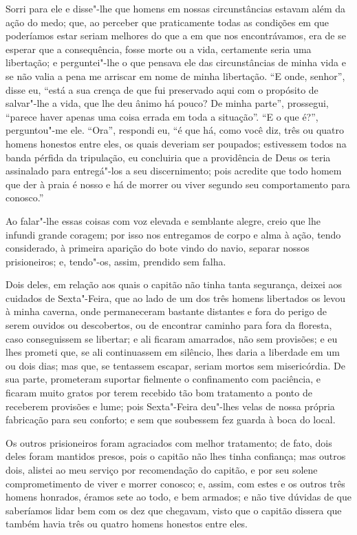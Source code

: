 Sorri para ele e disse"-lhe que homens em nossas circunstâncias estavam
além da ação do medo; que, ao perceber que praticamente todas as
condições em que poderíamos estar seriam melhores do que a em que nos
encontrávamos, era de se esperar que a consequência, fosse morte ou a
vida, certamente seria uma libertação; e perguntei"-lhe o que pensava ele
das circunstâncias de minha vida e se não valia a pena me arriscar em
nome de minha libertação. ``E onde, senhor'', disse eu, ``está a sua
crença de que fui preservado aqui com o propósito de salvar"-lhe a vida,
que lhe deu ânimo há pouco? De minha parte'', prossegui, ``parece haver
apenas uma coisa errada em toda a situação''. ``E o que é?'',
perguntou"-me ele. ``Ora'', respondi eu, ``é que há, como você diz, três
ou quatro homens honestos entre eles, os quais deveriam ser poupados;
estivessem todos na banda pérfida da tripulação, eu concluiria que a
providência de Deus os teria assinalado para entregá"-los a seu
discernimento; pois acredite que todo homem que der à praia é nosso e há
de morrer ou viver segundo seu comportamento para conosco.''

Ao falar"-lhe essas coisas com voz elevada e semblante alegre, creio que
lhe infundi grande coragem; por isso nos entregamos de corpo e alma à
ação, tendo considerado, à primeira aparição do bote vindo do navio,
separar nossos prisioneiros; e, tendo"-os, assim, prendido sem falha.

Dois deles, em relação aos quais o capitão não tinha tanta segurança,
deixei aos cuidados de Sexta"-Feira, que ao lado de um dos três homens
libertados os levou à minha caverna, onde permaneceram bastante
distantes e fora do perigo de serem ouvidos ou descobertos, ou de
encontrar caminho para fora da floresta, caso conseguissem se libertar;
e ali ficaram amarrados, não sem provisões; e eu lhes prometi que, se
ali continuassem em silêncio, lhes daria a liberdade em um ou dois dias;
mas que, se tentassem escapar, seriam mortos sem misericórdia. De sua
parte, prometeram suportar fielmente o confinamento com paciência, e
ficaram muito gratos por terem recebido tão bom tratamento a ponto de
receberem provisões e lume; pois Sexta"-Feira deu"-lhes velas de nossa
própria fabricação para seu conforto; e sem que soubessem fez guarda à
boca do local.

Os outros prisioneiros foram agraciados com melhor tratamento; de fato,
dois deles foram mantidos presos, pois o capitão não lhes tinha
confiança; mas outros dois, alistei ao meu serviço por recomendação do
capitão, e por seu solene comprometimento de viver e morrer conosco; e,
assim, com estes e os outros três homens honrados, éramos sete ao todo,
e bem armados; e não tive dúvidas de que saberíamos lidar bem com os dez
que chegavam, visto que o capitão dissera que também havia três ou
quatro homens honestos entre eles.

